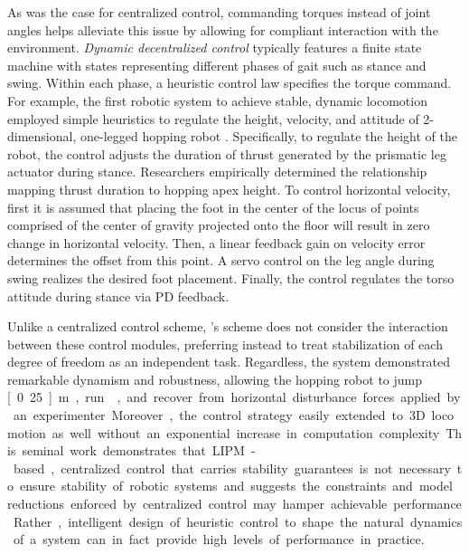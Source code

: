 As was the case for centralized control, commanding torques instead of joint
angles helps alleviate this issue by allowing for compliant interaction with the
environment. \emph{Dynamic decentralized control} typically features a finite
state machine with states representing different phases of gait such as stance
and swing. Within each phase, a heuristic control law specifies the torque
command. For example, the first robotic system to achieve stable, dynamic
locomotion employed simple heuristics to regulate the height, velocity, and
attitude of 2-dimensional, one-legged hopping robot
\citep{raibert1983dynamically}. Specifically, to regulate the height of the
robot, the control adjusts the duration of thrust generated by the prismatic leg
actuator during stance. Researchers empirically determined the relationship
mapping thrust duration to hopping apex height. To control horizontal velocity,
first it is assumed that placing the foot in the center of the locus of points
comprised of the center of gravity projected onto the floor will result in zero
change in horizontal velocity. Then, a linear feedback gain on velocity error
determines the offset from this point. A servo control on the leg angle during
swing realizes the desired foot placement. Finally, the control regulates the
torso attitude during stance via PD feedback. 

Unlike a centralized control scheme, \citeauthor{raibert1983dynamically}'s
scheme does not consider the interaction between these control modules,
preferring instead to treat stabilization of each degree of freedom as an
independent task. Regardless, the system demonstrated remarkable dynamism and
robustness, allowing the hopping robot to jump \unit[0.25]{m}, run
, and recover from horizontal disturbance forces applied by
an experimenter. Moreover, the control strategy easily extended to 3D locomotion
as well without an exponential increase in computation complexity. This seminal
work demonstrates that LIPM-based, centralized control that carries stability
guarantees is not necessary to ensure stability of robotic systems and suggests
the constraints and model reductions enforced by centralized control may hamper
achievable performance. Rather, intelligent design of heuristic control to shape
the natural dynamics of a system can in fact provide high levels of performance
in practice.


